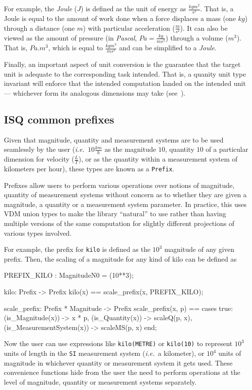 \documentclass[runningheads,a4paper]{llncs}
\begin{document}
For example, the \textit{Joule} (\(J\)) is defined as the unit of energy as \(\frac{kgm^2}{s^2}\). That is, a Joule is equal to the amount of work done when a force displaces a mass (one \(kg\)) through a distance (one \(m\)) with particular acceleration (\(\frac{m}{s^2}\)). It can also be viewed as the amount of pressure (in \textit{Pascal}, \(Pa = \frac{kg}{ms^2}\)) through a volume (\(m^3\)). That is, \(Pa . m^3\), which is equal to \(\frac{kgm^3}{ms^2}\) and can be simplified to a \textit{Joule}. 

Finally, an important aspect of unit conversion is the guarantee that the target unit is adequate to the corresponding task intended. That is, a quanity unit type invariant will enforce that the intended computation landed on the intended unit --- whichever form its analogous dimensions may take (see~). 

\subsection*{ISQ common prefixes}

Given that magnitude, quantity and measurement systems are to be used seamlessly by the user (\textit{i.e.}~\(10\frac{km}{h}\) as the magnitude \(10\), quantity \(10\) of a particular dimension for velocity (\(\frac{L}{T}\)), or as the quantity within a measurement system of kilometers per hour), these types are known as a \texttt{Prefix}. 

Prefixes allow users to perform various operations over notions of magnitude, quantity of measurement systems without concern as to whether they are given a magnitude, a quantity or a measurement system parameter. In practice, this uses VDM union types to make the library ``natural'' to use rather than having multiple versions of the same computation for slightly different projections of various types involved. 

For example, the prefix for \texttt{kilo} is defined as the \(10^3\) magnitude of any given prefix. Then, the scaling of a magnitude for any kind of kilo can be defined as
%
\begin{vdmsl}[frame=none,basicstyle=\ttfamily\scriptsize]
    PREFIX_KILO   : MagnitudeN0 = (10**3);

    kilo: Prefix -> Prefix
    kilo(x) == scale_prefix(x, PREFIX_KILO);

    scale_prefix: Prefix * Magnitude -> Prefix
    scale_prefix(x, p) == 
        cases true:
            (is_Magnitude(x))         -> x * p,
            (is_Quantity(x))          -> scaleQ(p, x),
            (is_MeasurementSystem(x)) -> scaleMS(p, x)
        end;
\end{vdmsl}
%
\noindent Now the user can use expressions like \texttt{kilo(METRE)} or \texttt{kilo(10)} to represent \(10^3\) units of length in the \texttt{SI} measurement system (\textit{i.e.}~a kilometer), or \(10^4\) units of magnitude in whichever quantity or measurement system it gets used. These convenience functions hide from the user the need to perform operations at the level of magnitude, quantity or measurement systems separately. 
\end{document}

